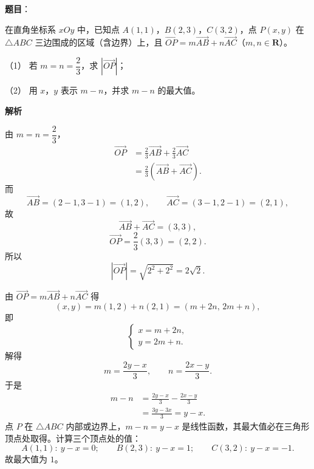 \begin{answer}

\textbf{题目}：

在直角坐标系 $xOy$ 中，已知点 $A(1,1)$，$B(2,3)$，$C(3,2)$，点 $P(x,y)$ 在 $\triangle ABC$ 三边围成的区域（含边界）上，且 $\overrightarrow{OP}=m\overrightarrow{AB}+n\overrightarrow{AC}$（$m,n\in\mathbf R$）。

（1） 若 $m=n=\dfrac23$，求 $|\overrightarrow{OP}|$；

（2） 用 $x$，$y$ 表示 $m-n$，并求 $m-n$ 的最大值。

\textbf{解析}


由 $m=n=\dfrac23$，
\nopagebreak[4]
\[\begin{aligned}
\overrightarrow{OP}
&=\frac23\overrightarrow{AB}+\frac23\overrightarrow{AC}\\
&=\frac23\left(\overrightarrow{AB}+\overrightarrow{AC}\right).
\end{aligned}\]
而
\nopagebreak[4]
\[\overrightarrow{AB}=(2-1,3-1)=(1,2),\qquad
\overrightarrow{AC}=(3-1,2-1)=(2,1),\]
故
\nopagebreak[4]
\[\overrightarrow{AB}+\overrightarrow{AC}=(3,3),\]
\nopagebreak[4]
\[\overrightarrow{OP}=\frac23(3,3)=(2,2).\]
所以
\nopagebreak[4]
\[|\overrightarrow{OP}|=\sqrt{2^2+2^2}=2\sqrt2.\]


由 $\overrightarrow{OP}=m\overrightarrow{AB}+n\overrightarrow{AC}$ 得
\nopagebreak[4]
\[(x,y)=m(1,2)+n(2,1)=(m+2n,\,2m+n),\]
即
\nopagebreak[4]
\[\begin{cases}
x=m+2n,\\
y=2m+n.
\end{cases}\]
解得
\nopagebreak[4]
\[m=\frac{2y-x}{3},\qquad n=\frac{2x-y}{3}.\]
于是
\nopagebreak[4]
\[\begin{aligned}
m-n&=\frac{2y-x}{3}-\frac{2x-y}{3}\\
&=\frac{3y-3x}{3}=y-x.
\end{aligned}\]
点 $P$ 在 $\triangle ABC$ 内部或边界上，$m-n=y-x$ 是线性函数，其最大值必在三角形顶点处取得。计算三个顶点处的值：
\nopagebreak[4]
\[A(1,1):\ y-x=0;\qquad
B(2,3):\ y-x=1;\qquad
C(3,2):\ y-x=-1.\]
故最大值为 $1$。



\end{answer}
